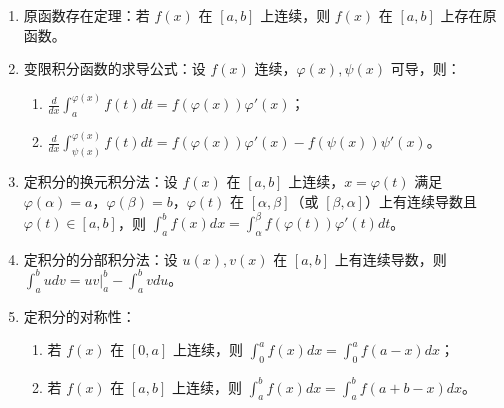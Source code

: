 \documentclass[UTF8]{ctexart}
\theoremstyle{remark}
\begin{document}
\begin{enumerate}
	\item 原函数存在定理：若 \(f(x)\) 在 \([a, b]\) 上连续，则 \(f(x)\) 在 \([a, b]\) 上存在原函数。
	
	\item 变限积分函数的求导公式：设 \(f(x)\) 连续，\(\varphi(x), \psi(x)\) 可导，则：
	\begin{enumerate}
		\item \(\frac{d}{dx}\int_{a}^{\varphi(x)}f(t)dt = f(\varphi(x))\varphi'(x)\)；
		\item \(\frac{d}{dx}\int_{\psi(x)}^{\varphi(x)}f(t)dt = f(\varphi(x))\varphi'(x) - f(\psi(x))\psi'(x)\)。
	\end{enumerate}
	
	\item 定积分的换元积分法：设 \(f(x)\) 在 \([a, b]\) 上连续，\(x = \varphi(t)\) 满足 \(\varphi(\alpha) = a\)，\(\varphi(\beta) = b\)，\(\varphi(t)\) 在 \([\alpha, \beta]\)（或 \([\beta, \alpha]\)）上有连续导数且 \(\varphi(t) \in [a, b]\)，则 \(\int_{a}^{b}f(x)dx = \int_{\alpha}^{\beta}f(\varphi(t))\varphi'(t)dt\)。
	
	\item 定积分的分部积分法：设 \(u(x), v(x)\) 在 \([a, b]\) 上有连续导数，则 \(\int_{a}^{b}u dv = \left.uv\right|_{a}^{b} - \int_{a}^{b}v du\)。
	
	\item 定积分的对称性：
	\begin{enumerate}
		\item 若 \(f(x)\) 在 \([0, a]\) 上连续，则 \(\int_{0}^{a}f(x)dx = \int_{0}^{a}f(a - x)dx\)；
		\item 若 \(f(x)\) 在 \([a, b]\) 上连续，则 \(\int_{a}^{b}f(x)dx = \int_{a}^{b}f(a + b - x)dx\)。
	\end{enumerate}
	

\end{enumerate}
\end{document}
